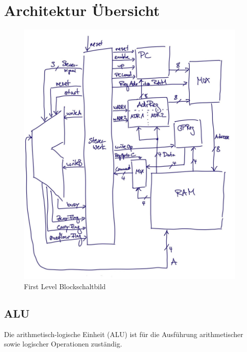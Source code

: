 \chapter{Architektur Übersicht}
\label{chap:Architektur-Übersicht}


\begin{figure}[H]
  \centering
  \includegraphics[scale=0.25]
  {content/figures/BSB_SW.jpg}
  \caption{First Level Blockschaltbild}
  \label{fig:blockschaltbild-first-level}
\end{figure}



\section{ALU}
Die arithmetisch-logische Einheit (ALU) ist für die Ausführung
arithmetischer sowie logischer Operationen zuständig.

